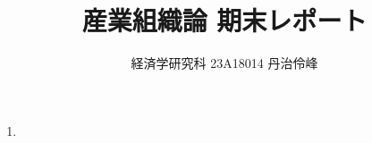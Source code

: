 \documentclass{jsarticle}
\begin{document}
\title{産業組織論 期末レポート}
\author{経済学研究科 23A18014 丹治伶峰}
\date{}
\maketitle

\begin{enumerate}

\item 

\end{enumerate}
\end{document}
